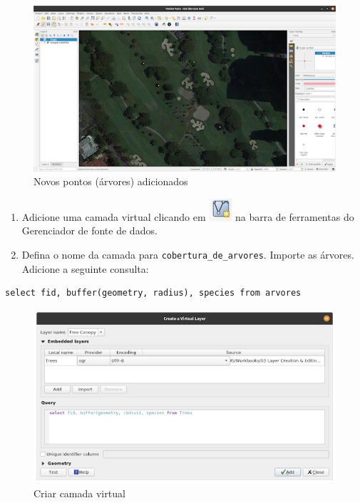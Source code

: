 \documentclass[
  portuguese,
]{krantz}
\providecommand{\tightlist}{%
  \setlength{\itemsep}{0pt}\setlength{\parskip}{0pt}}
\begin{document}
\begin{figure}
\centering
\includegraphics{media/modulo2/virtual-4.png}
\caption{Novos pontos (árvores) adicionados}
\end{figure}

\begin{enumerate}
\def\labelenumi{\arabic{enumi}.}
\setcounter{enumi}{8}
\tightlist
\item
  Adicione uma camada virtual clicando em \includegraphics{media/modulo2/symbol-virtual.png}
  na barra de ferramentas do Gerenciador de fonte de dados.
\item
  Defina o nome da camada para \texttt{cobertura\_de\_arvores}. Importe as árvores. Adicione a seguinte consulta:
\end{enumerate}

\begin{verbatim}
select fid, buffer(geometry, radius), species from arvores
\end{verbatim}

\begin{figure}
\centering
\includegraphics{media/modulo2/virtual-5.png}
\caption{Criar camada virtual}
\end{figure}
\end{document}
